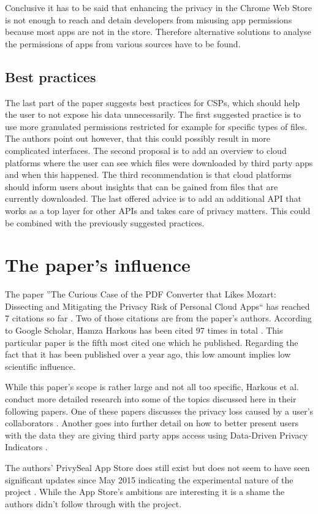 \documentclass[11pt,twocolumn,a4paper,DIV=calc]{scrartcl}
\begin{document}
Conclusive it has to be said that enhancing the privacy in the Chrome Web Store is not enough to reach and detain developers from misusing app permissions because most apps are not in the store. Therefore alternative solutions to analyse the permissions of apps from various sources have to be found.  
\subsection{Best practices}
The last part of the paper suggests best practices for CSPs, which should help the user to not expose his data unnecessarily. The first suggested practice is to use more granulated permissions restricted for example for specific types of files. The authors point out however, that this could possibly result in more complicated interfaces. The second proposal is to add an overview to cloud platforms where the user can see which files were downloaded by third party apps and when this happened. The third recommendation is that cloud platforms should inform users about insights that can be gained from files that are currently downloaded. The last offered advice is to add an additional API that works as a top layer for other APIs and takes care of privacy matters. This could be combined with the previously suggested practices.
\section{The paper's influence}
The paper ''The Curious Case of the PDF Converter that Likes Mozart: Dissecting and Mitigating the Privacy Risk of Personal Cloud Apps`` has reached 7 citations so far \cite{citations}. Two of those citations are from the paper's authors. According to Google Scholar, Hamza Harkous has been cited 97 times in total \cite{citesHamza}.
This particular paper is the fifth most cited one which he published. Regarding the fact that it has been published over a year ago, this low amount implies low scientific influence.

While this paper's scope is rather large and not all too specific, Harkous et al. conduct more detailed research into some of the topics discussed here in their following papers. One of these papers discusses the privacy loss caused by a user’s collaborators \cite{HarkousCollaborators}. Another goes into further detail on how to better present users with the data they are giving third party apps access using Data-Driven Privacy Indicators \cite{HarkousDDPI}.

The authors’ PrivySeal App Store does still exist but does not seem to have seen significant updates since May 2015 indicating the experimental nature of the project \cite{Privyseal}. While the App Store’s ambitions are interesting it is a shame the authors didn’t follow through with the project.
\end{document}
